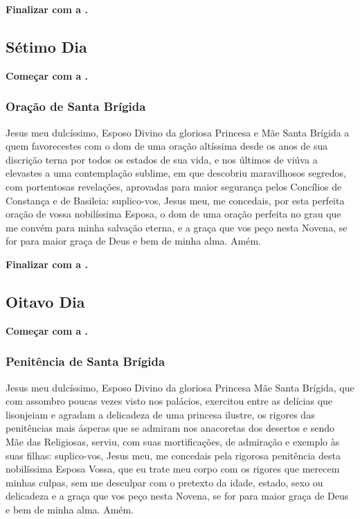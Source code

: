 \documentclass[a4paper,12pt]{extarticle} \usepackage[utf8]{inputenc}
\begin{document}
\noindent
\textbf{Finalizar com a .}


\subsection{Sétimo Dia}

\noindent
\textbf{Começar com a .}

\subsubsection*{Oração de Santa Brígida}

Jesus meu dulcíssimo, Esposo Divino da gloriosa Princesa e Mãe Santa Brígida a quem favorecestes com o dom de uma oração altíssima desde os anos de sua discrição terna por todos os estados de sua vida, e nos últimos de viúva a elevastes a uma contemplação sublime, em que descobriu maravilhosos segredos, com portentosas revelações, aprovadas para maior segurança pelos Concílios de Constança e de Basileia: suplico-vos, Jesus meu, me concedais, por esta perfeita oração de vossa nobilíssima Esposa, o dom de uma oração perfeita no grau que me convém para minha salvação eterna, e a graça que vos peço nesta Novena, se for para maior graça de Deus e bem de minha alma. Amém.

\noindent
\textbf{Finalizar com a .}


\subsection{Oitavo Dia}

\noindent
\textbf{Começar com a .}

\subsubsection*{Penitência de Santa Brígida}

Jesus meu dulcíssimo, Esposo Divino da gloriosa Princesa Mãe Santa Brígida, que com assombro poucas vezes visto nos palácios, exercitou entre as delícias que lisonjeiam e agradam a delicadeza de uma princesa ilustre, os rigores das penitências mais ásperas que se admiram nos anacoretas dos desertos e sendo Mãe das Religiosas, serviu, com suas mortificações, de admiração e exemplo às suas filhas: suplico-vos, Jesus meu, me concedais pela rigorosa penitência desta nobilíssima Esposa Vossa, que eu trate meu corpo com os rigores que merecem minhas culpas, sem me desculpar com o pretexto da idade, estado, sexo ou delicadeza e a graça que vos peço nesta Novena, se for para maior graça de Deus e bem de minha alma. Amém.
\end{document}
